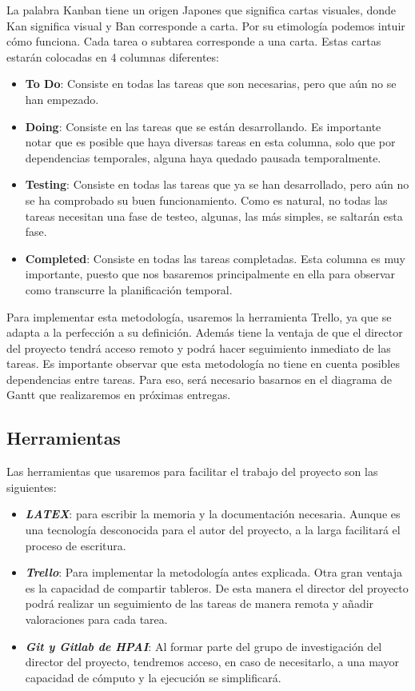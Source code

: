 La palabra Kanban tiene un origen Japones que significa cartas visuales, donde Kan significa visual y Ban corresponde a carta. Por su etimología podemos intuir cómo funciona. Cada tarea o subtarea corresponde a una carta. Estas cartas estarán colocadas en 4 columnas diferentes:

\begin{itemize}
    \item \textbf{To Do}: Consiste en todas las tareas que son necesarias, pero que aún no se han empezado.
    \item \textbf{Doing}: Consiste en las tareas que se están desarrollando. Es importante notar que es posible que haya diversas tareas en esta columna, solo que por dependencias temporales, alguna haya quedado pausada temporalmente.
    \item \textbf{Testing}: Consiste en todas las tareas que ya se han desarrollado, pero aún no se ha comprobado su buen funcionamiento. Como es natural, no todas las tareas necesitan una fase de testeo, algunas, las más simples, se saltarán esta fase.
    \item \textbf{Completed}: Consiste en todas las tareas completadas. Esta columna es muy importante, puesto que nos basaremos principalmente en ella para observar como transcurre la planificación temporal.  
\end{itemize}
Para implementar esta metodología, usaremos la herramienta Trello, ya que se adapta a la perfección a su definición. Además tiene la ventaja  de que el director del proyecto tendrá acceso remoto y podrá hacer seguimiento inmediato de las tareas. Es importante observar que esta metodología no tiene en cuenta posibles dependencias entre tareas. Para eso, será necesario basarnos en el diagrama de Gantt que realizaremos en próximas entregas.
\subsection{Herramientas}
Las herramientas que usaremos para facilitar el trabajo del proyecto son las siguientes:
\begin{itemize}
    \item \textbf{\textit{LATEX}}: para escribir la memoria y la documentación necesaria. Aunque es una tecnología desconocida para el autor del proyecto, a la larga facilitará el proceso de escritura.
    \item \textbf{\textit{Trello}}: Para implementar la metodología antes explicada. Otra gran ventaja es la capacidad de compartir tableros. De esta manera el director del proyecto podrá realizar un seguimiento de las tareas de manera remota y añadir valoraciones para cada tarea.
    \item \textbf{\textit{Git y Gitlab de HPAI}}: Al formar parte del grupo de investigación del director del proyecto, tendremos acceso, en caso de necesitarlo, a una mayor capacidad de cómputo y la ejecución se simplificará.
\end{itemize}

